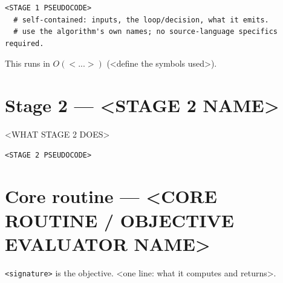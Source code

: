 \begin{verbatim}
<STAGE 1 PSEUDOCODE>
  # self-contained: inputs, the loop/decision, what it emits.
  # use the algorithm's own names; no source-language specifics required.
\end{verbatim}

This runs in $O(<...>)$ (<define the symbols used>).

\section{Stage 2 --- <STAGE 2 NAME>}
<WHAT STAGE 2 DOES>

\begin{verbatim}
<STAGE 2 PSEUDOCODE>
\end{verbatim}


\section{Core routine --- <CORE ROUTINE / OBJECTIVE EVALUATOR NAME>}
\texttt{<signature>} is the objective. <one line: what it computes and returns>.

